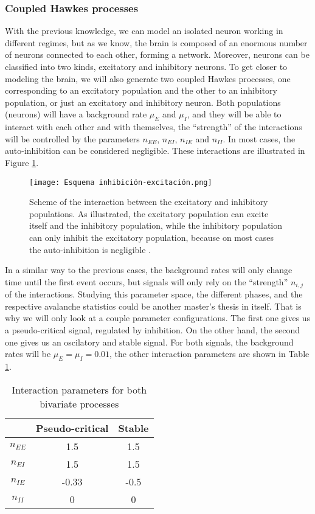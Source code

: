 \subsubsection{Coupled Hawkes processes} \label{subsubsec:Coupled_Hawkes_processes}
With the previous knowledge, we can model an isolated neuron working in different regimes, but as we know, the brain is composed of an enormous number of neurons connected to each 
other, forming a network. Moreover, neurons can be classified into two kinds, excitatory and inhibitory neurons. To get closer to modeling the brain, we will also generate two coupled
Hawkes processes, one corresponding to an excitatory population and the other to an inhibitory population, or just an excitatory and inhibitory neuron. 
Both populations (neurons) will have a background rate  $\mu_E$ and $\mu_I$, and they will be able to interact with each other and with themselves, the ``strength'' of the interactions 
will be controlled by the parameters $n_{EE}$, $n_{EI}$, $n_{IE}$ and $n_{II}$. In most cases, the auto-inhibition can be considered negligible. 
These interactions are illustrated in Figure \ref{f: Hawkes coupled}.  

\begin{figure}[H]
\centering
\texttt{[image: Esquema inhibición-excitación.png]}
\caption{Scheme of the interaction between the excitatory and inhibitory populations. As illustrated, the excitatory population can excite itself and the inhibitory population, while the
inhibitory population can only inhibit the excitatory population, because on most cases the auto-inhibition is negligible \cite{kalle2018growing}.}
\label{f: Hawkes coupled}
\end{figure}

In a similar way to the previous cases, the background rates will only change time until the first event occurs, but signals will only rely on the ``strength'' $n_{i,j}$ of the interactions.
Studying this parameter space, the different phases, and the respective avalanche statistics could be another master's thesis in itself. That is why we will only look at a couple parameter 
configurations. The first one gives us a pseudo-critical signal, regulated by inhibition. On the other hand, the second one gives us an oscilatory and stable signal. For both signals, 
the background rates will be $\mu_E=\mu_I=0.01$, the other interaction parameters are shown in Table \ref{tab: Hawkes coupled parameters}.


\begin{table}[H]
    \centering
    \caption{Interaction parameters for both bivariate processes}
    \label{tab: Hawkes coupled parameters}
    \begin{tabular}{@{}ccc@{}}
    \toprule
     & \multicolumn{1}{c}{Pseudo-critical} & \multicolumn{1}{c}{Stable} \\ \midrule
    $n_{EE}$ & 1.5 & 1.5 \\
    $n_{EI}$ & 1.5 & 1.5 \\
    $n_{IE}$ & -0.33 & -0.5 \\
    $n_{II}$ & 0 & 0 \\ \bottomrule
    \end{tabular}
\end{table}

